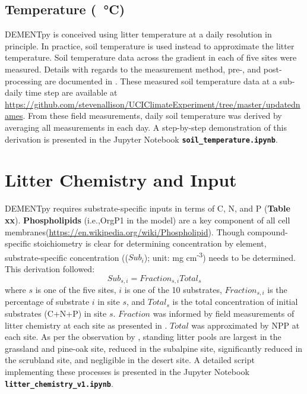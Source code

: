 \documentclass[letterpaper, 10pt]{article}
\begin{document}
\subsection{Temperature (\SI{}{\celsius})}
DEMENTpy is conceived using litter temperature at a daily resolution in principle. In practice, soil temperature is used instead to approximate the litter temperature. Soil temperature data across the gradient in each of five sites were measured. Details with regards to the measurement method, pre-, and post-processing are documented in \citet{glassman2018decomposition}. These measured soil temperature data at a sub-daily time step are available at \url{https://github.com/stevenallison/UCIClimateExperiment/tree/master/updatednames}. From these field measurements, daily soil temperature was derived by averaging all measurements in each day. A step-by-step demonstration of this derivation is presented in the Jupyter Notebook \textbf{\texttt{soil\_temperature.ipynb}}.


\section{\large Litter Chemistry and Input}
DEMENTpy requires substrate-specific inputs in terms of C, N, and P (\textbf{Table xx}). \textbf{Phospholipids} (i.e.,OrgP1 in the model) are a key component of all cell membranes(\url{https://en.wikipedia.org/wiki/Phospholipid}). Though compound-specific stoichiometry is clear for determining concentration by element, substrate-specific concentration (($Sub_i$); unit: mg cm\textsuperscript{-3}) needs to be determined. This derivation followed:
\begin{equation}
  Sub_{s,i} = Fraction_{s,i} Total_s 
\end{equation}
where $s$ is one of the five sites, $i$ is one of the 10 substrates, $Fraction_{s,i}$ is the percentage of substrate $i$ in site $s$, and $Total_s$ is the total concentration of initial substrates (C+N+P) in site $s$.  $Fraction$ was informed by field measurements of litter chemistry at each site as presented in \citet{baker2017extracellular}. $Total$ was approximated by NPP at each site. As per the observation by \citet{baker2017extracellular}, standing litter pools are largest in the grassland and pine-oak site, reduced in the subalpine site, significantly reduced in the scrubland site, and negligible in the desert site. A detailed script implementing these processes is presented in the Jupyter Notebook \textbf{\texttt{litter\_chemistry\_v1.ipynb}}.




\end{document}
